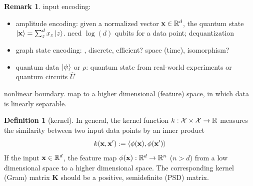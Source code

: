 \documentclass[
10pt,
aps,
pra,
linenumbers,
floatfix,
]{revtex4-2}
\theoremstyle{plain}
\theoremstyle{definition}
\newtheorem{definition}{Definition}
\newtheorem{remark}{Remark}
\newcommand{\kernel}{k}
\newcommand{\U}{\hat{U}}
\newcommand{\dm}{\rho}
\newcommand{\oracle}{\hat{O}}
\begin{document}
\begin{remark}
	input encoding: 
	\begin{itemize}


		\item amplitude encoding: given a normalized vector $\vb{x}\in\mathbb{R}^d$, the quantum state $\ket{\vb{x}}=\sum_z^d x_z\ket{z}$. 
		need $\log(d) $ qubits for a data point; dequantization \cite{tangQuantumPrincipalComponent2021}

		\item graph state encoding: , discrete, efficient? space (time), isomorphism?

		\item quantum data $\ket{\psi}$ or $\dm$: quantum state from real-world experiments or quantum circuits $\U$

	\end{itemize}
\end{remark}
nonlinear boundary. map to a higher dimensional (feature) space, in which data is linearly separable.
\begin{definition}[kernel]\label{def:kernel}
	In general, the kernel function $\kernel:\mathcal{X}\times \mathcal{X} \to \realnumber$ measures the similarity between two input data points by an inner product
	\begin{equation}
		\kernel (\vbx,\vbx') : = \expval{\phi(\vbx),\phi(\vbx')}
	\end{equation}
	If the input $\vb{x}\in \mathbb{R}^d$, the feature map $\phi(\vb{x}): \mathbb{R}^d\to \mathbb{R}^n$ ($n > d$) from a low dimensional space to a higher dimensional space.
	The corresponding kernel (Gram) matrix $\mathbf{K}$ should be a positive, semidefinite (PSD) matrix.
\end{definition}
\end{document}
